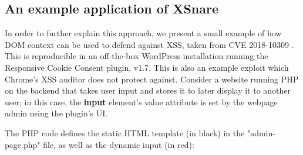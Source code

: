 \subsection{An example application of XSnare} \label{motivating_example}

In order to further explain this approach, we present a small example of how DOM context can be used to defend against XSS, taken from CVE 2018-10309 \cite{examplecve}. This is reproducible in an off-the-box WordPress installation running the Responsive Cookie Consent plugin, v1.7. This is also an example exploit which Chrome's XSS auditor does not protect against. Consider a website running PHP on the backend that takes user input and stores it to later display it to another user; in this case, the \textbf{input} element's value attribute is set by the webpage admin using the plugin's UI.

The PHP code defines the static HTML template (in black) in the "admin-page.php" file, as well as the dynamic input (in red):

